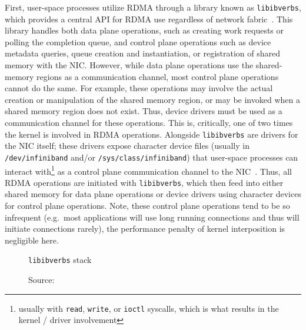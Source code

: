 \documentclass[12pt,titlepage]{article}
\begin{document}
First, user-space processes utilize RDMA through a library known as \texttt{libibverbs}, which provides a central API for RDMA use regardless of network fabric~\cite{rdmacoredocumentation}.
This library handles both data plane operations, such as creating work requests or polling the completion queue, and control plane operations such as device metadata queries, queue creation and instantiation, or registration of shared memory with the NIC\@.
However, while data plane operations use the shared-memory regions as a communication channel, most control plane operations cannot do the same.
For example, these operations may involve the actual creation or manipulation of the shared memory region, or may be invoked when a shared memory region does not exist.
Thus, device drivers must be used as a communication channel for these operations.
This is, critically, one of two times the kernel is involved in RDMA operations.
Alongside \texttt{libibverbs} are drivers for the NIC itself;
these drivers expose character device files (usually in \texttt{/dev/infiniband} and/or \texttt{/sys/class/infiniband}) that user-space processes can interact with\footnote{usually with \texttt{read}, \texttt{write}, or \texttt{ioctl} syscalls, which is what results in the kernel / driver involvement} as a control plane communication channel to the NIC~\cite{linuxkernellibibverbs}.
Thus, all RDMA operations are initiated with \texttt{libibverbs}, which then feed into either shared memory for data plane operations or device drivers using character devices for control plane operations.
Note, these control plane operations tend to be so infrequent (e.g.\ most applications will use long running connections and thus will initiate connections rarely), the performance penalty of kernel interposition is negligible here.

\begin{figure}
	\centering
	\caption{\texttt{libibverbs} stack}
	\caption*{Source:~\cite{mlnxofedmanual}}
\end{figure}
\end{document}
